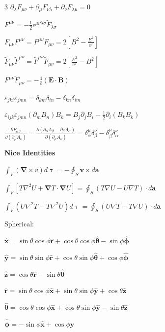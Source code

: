 \documentclass[a4paper,twoside]{article}
\newcommand{\secblock}[1]{%
\par\vspace{1.8pt}%
\noindent\colorbox{hdrcol}{\parbox[c][1.0em][c]{0.98\linewidth}{\color{white}\bfseries\small #1}}\par
\vspace{1pt}%
}
\begin{document}
\begin{multicols*}{3}
\(\partial_\lambda F_{\mu\nu} + \partial_\mu F_{\nu\lambda} + \partial_\nu F_{\lambda\mu} = 0 \)

\(F^{\mu\nu} = - \frac{1}{2} \epsilon^{\mu\nu\lambda\sigma} \tilde{F}_{\lambda\sigma} \)     

\(F_{\mu \nu} F^{\mu \nu} = F^{\mu \nu} F_{\mu \nu}  = 2[ B^2 - \frac{E^2}{c^2} ]\)

\(\tilde{F}_{\mu \nu} \tilde{F}^{\mu \nu} = \tilde{F}^{\mu \nu} \tilde{F}_{\mu \nu}  = 2[ \frac{E^2}{c^2} - B^2]\)

\(F^{\mu \nu } \tilde{F}_{\mu \nu} = -\frac{4}{c}(\bm E \cdot \bm B)\)

\(\varepsilon_{jki}\varepsilon_{jmn} = \delta_{km}\delta_{in} - \delta_{kn}\delta_{im}\)

\(\varepsilon_{ijk}\varepsilon_{jmn}(\partial_m B_n)B_k = B_j\partial_j B_i - \tfrac{1}{2}\partial_i(B_k B_k)\)

\(\frac{\partial F_{\alpha\beta}}{\partial(\partial_\mu A_\nu)} = \frac{\partial(\partial_\alpha A_\beta - \partial_\beta A_\alpha)}{\partial(\partial_\mu A_\nu)} = \delta^\mu_\alpha \delta^\nu_\beta - \delta^\mu_\beta \delta^\nu_\alpha\)



\secblock{Nice Identities}
\(\int_V (\bm \nabla \times v) d \uptau = - \oint_S \bm v \times d \bm a\)

\(\int_V [T \nabla^2 U + \bm \nabla T \cdot \bm \nabla U] = \oint_S (T \nabla U - U \nabla T) \cdot d \bm a\)

\(\int_V (U \nabla^2 T - T \nabla^2 U) d \uptau = \oint_S (U \nabla T - T \nabla U) \cdot d \bm a\)

Spherical:

\(\hat{\bm x} = \sin \theta \cos \phi \hat{\bm r} + \cos \theta \cos \phi \hat{\bm \theta}-\sin \phi \hat{\bm \phi}\)

\(\hat{\bm y} = \sin\theta \sin \phi \hat{\bm r} + \cos\theta \sin \phi \hat{\bm \theta} + \cos \phi \hat{\bm \phi}\)

\(\hat{\bm z} = \cos \theta \hat{\bm r} - \sin \theta \hat{\bm \theta}\)

\(\hat{\bm{r}} = \sin\theta \cos \phi \hat{\bm x} + \sin \theta \sin \phi \hat{\bm y}+\cos \theta \hat{\bm z}\)

\(\hat{\bm \theta} = \cos\theta\cos\phi \hat{\bm x} + \cos\theta\sin\phi \hat{\bm y} - \sin\theta \hat{\bm z}\)

\(\hat{\bm \phi} = -\sin\phi \hat{\bm x} + \cos\phi \hat{\bm y}\)


\end{multicols*}
\end{document}
